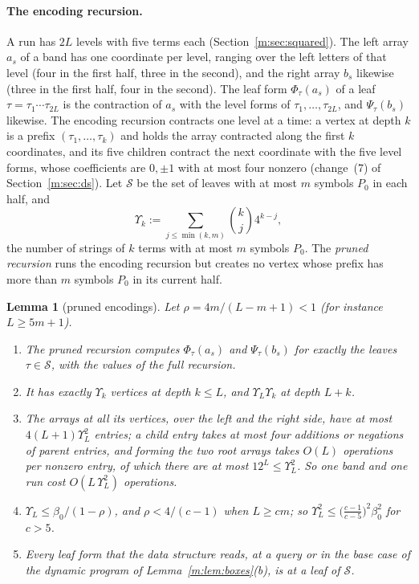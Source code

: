\documentclass[11pt]{article}
\newtheorem{lemma}[theorem]{Lemma}
\theoremstyle{definition}
\theoremstyle{remark}
\begin{document}
\paragraph{The encoding recursion.} A run has $2L$ levels with five terms each (Section~\ref{m:sec:squared}). The left array $a_s$ of a band has one coordinate per level, ranging over the left letters of that level (four in the first half, three in the second), and the right array $b_s$ likewise (three in the first half, four in the second). The leaf form $\Phi_\tau(a_s)$ of a leaf $\tau=\tau_1\cdots\tau_{2L}$ is the contraction of $a_s$ with the level forms of $\tau_1,\dots,\tau_{2L}$, and $\Psi_\tau(b_s)$ likewise. The encoding recursion contracts one level at a time: a vertex at depth $k$ is a prefix $(\tau_1,\dots,\tau_k)$ and holds the array contracted along the first $k$ coordinates, and its five children contract the next coordinate with the five level forms, whose coefficients are $0,\pm1$ with at most four nonzero (change~(7) of Section~\ref{m:sec:ds}). Let $\mathcal S$ be the set of leaves with at most $m$ symbols $P_0$ in each half, and
\[
\Upsilon_k:=\sum_{j\le\min(k,m)}\binom kj4^{k-j},
\]
the number of strings of $k$ terms with at most $m$ symbols $P_0$. The \emph{pruned recursion} runs the encoding recursion but creates no vertex whose prefix has more than $m$ symbols $P_0$ in its current half.

\begin{lemma}[pruned encodings]\label{m:lem:pruned}
Let $\rho=4m/(L-m+1)<1$ (for instance $L\ge5m+1$).
\begin{enumerate}[label=(\alph*),nosep]
\item The pruned recursion computes $\Phi_\tau(a_s)$ and $\Psi_\tau(b_s)$ for exactly the leaves $\tau\in\mathcal S$, with the values of the full recursion.
\item It has exactly $\Upsilon_k$ vertices at depth $k\le L$, and $\Upsilon_L\Upsilon_k$ at depth $L+k$.
\item The arrays at all its vertices, over the left and the right side, have at most $4(L+1)\Upsilon_L^2$ entries; a child entry takes at most four additions or negations of parent entries, and forming the two root arrays takes $O(L)$ operations per nonzero entry, of which there are at most $12^L\le\Upsilon_L^2$. So one band and one run cost $O(L\,\Upsilon_L^2)$ operations.
\item $\Upsilon_L\le\beta_0/(1-\rho)$, and $\rho<4/(c-1)$ when $L\ge cm$; so $\Upsilon_L^2\le\big(\frac{c-1}{c-5}\big)^2\beta_0^2$ for $c>5$.
\item Every leaf form that the data structure reads, at a query or in the base case of the dynamic program of Lemma~\ref{m:lem:boxes}(b), is at a leaf of $\mathcal S$.
\end{enumerate}
\end{lemma}
\end{document}
